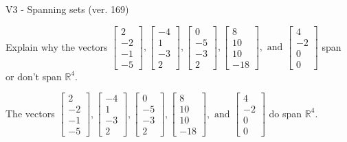 \begin{exercise}
  \begin{exerciseTitle}V3 - Spanning sets (ver. 169)\end{exerciseTitle}
  \begin{exerciseStatement}
    Explain why the vectors \(\left[\begin{array}{r}
2 \\
-2 \\
-1 \\
-5
\end{array}\right] , \left[\begin{array}{r}
-4 \\
1 \\
-3 \\
2
\end{array}\right] , \left[\begin{array}{r}
0 \\
-5 \\
-3 \\
2
\end{array}\right] , \left[\begin{array}{r}
8 \\
10 \\
10 \\
-18
\end{array}\right] , \text{ and } \left[\begin{array}{r}
4 \\
-2 \\
0 \\
0
\end{array}\right]\) span or don't span \(\mathbb{R}^4\). 
	


  \end{exerciseStatement}
  \begin{exerciseAnswer}
   The vectors \(\left[\begin{array}{r}
2 \\
-2 \\
-1 \\
-5
\end{array}\right] , \left[\begin{array}{r}
-4 \\
1 \\
-3 \\
2
\end{array}\right] , \left[\begin{array}{r}
0 \\
-5 \\
-3 \\
2
\end{array}\right] , \left[\begin{array}{r}
8 \\
10 \\
10 \\
-18
\end{array}\right] , \text{ and } \left[\begin{array}{r}
4 \\
-2 \\
0 \\
0
\end{array}\right]\) 
  	 do  
	span \(\mathbb{R}^4\).
  



\end{exerciseAnswer}
\end{exercise}
